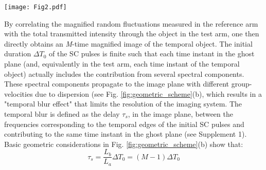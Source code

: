 \documentclass[aip,graphicx]{revtex4-1}
\begin{document}
\begin{figure*}
	\centering
	\texttt{[image: Fig2.pdf]}
	\caption{Spectrum-to-time transformation of the incoherent supercontinuum (SC). (a) Temporal magnification of the intensity fluctuations of the SC. (b) Temporal resolution limit from the finite duration of the SC pulses. $\Delta T_0$ and $\Delta \nu_0$ represents the initial duration and bandwidth of the SC pulses, respectively. $\Delta T^{GP}$, and $\Delta T^{IP}$ represent the duration of the SC pulses at the ghost and image planes, respectively. $\tau_c^{GP}$ and $\tau_c^{IP}$ denote the characteristic fluctuation time within each SC pulse at the ghost and image planes, respectively. $\tau_s$ is the temporal blur resulting from the different spectral components $\lambda_1$ and $\lambda_2$ that corresponds to the temporal edges of the initial SC pulses and temporally overlap in the ghost plane.}
	\label{fig:geometric_scheme}
\end{figure*}

By correlating the magnified random fluctuations measured in the reference arm with the total transmitted intensity through the object in the test arm, one then directly obtains an \textit{M}-time magnified image of the temporal object. 
%
The initial duration $\Delta T_0$ of the SC pulses is finite such that each time instant in the ghost plane (and, equivalently in the test arm, each time instant of the temporal object) actually includes the contribution from several spectral components. These spectral components propagate to the image plane with different group-velocities due to dispersion (see Fig. \ref{fig:geometric_scheme}(b), which results in a "temporal blur effect" that limits the resolution of the imaging system. The temporal blur is defined as the delay $\tau_s$, in the image plane, between the frequencies corresponding to the temporal edges of the initial SC pulses and contributing to the same time instant in the ghost plane (see Supplement 1). Basic geometric considerations in Fig. \ref{fig:geometric_scheme}(b) show that:
\begin{equation}
\tau_s = \frac{L_b}{L_a} \Delta T_0 = (M-1)\Delta T_0
\end{equation}
\end{document}
